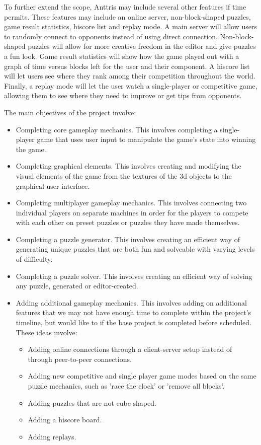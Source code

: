 \documentclass[12pt]{article}
\begin{document}
To further extend the scope, Anttris may include several other features if time permits. These features may include an online server, non-block-shaped puzzles, game result statistics, hiscore list and replay mode. A main server will allow users to randomly connect to opponents instead of using direct connection. Non-block-shaped puzzles will allow for more creative freedom in the editor and give puzzles a fun look. Game result statistics will show how the game played out with a graph of time versus blocks left for the user and their component. A hiscore list will let users see where they rank among their competition throughout the world. Finally, a replay mode will let the user watch a single-player or competitive game, allowing them to see where they need to improve or get tips from opponents.

The main objectives of the project involve:
\begin{itemize}
 \item Completing core gameplay mechanics. This involves completing a single-player game that uses user input to manipulate the game's state into winning the game.
 \item Completing graphical elements. This involves creating and modifying the visual elements of the game from the textures of the 3d objects to the graphical user interface.
 \item Completing multiplayer gameplay mechanics. This involves connecting two individual players on separate machines in order for the players to compete with each other on preset puzzles or puzzles they have made themselves.
 \item Completing a puzzle generator. This involves creating an efficient way of generating unique puzzles that are both fun and solveable with varying levels of difficulty.
 \item Completing a puzzle solver. This involves creating an efficient way of solving any puzzle, generated or editor-created.
 \item Adding additional gameplay mechanics. This involves adding on additional features that we may not have enough time to complete within the project's timeline, but would like to if the base project is completed before scheduled. These ideas involve:
  \begin{itemize}
  \item Adding online connections through a client-server setup instead of through peer-to-peer connections.
  \item Adding new competitive and single player game modes based on the same puzzle mechanics, such as 'race the clock' or 'remove all blocks'.
  \item Adding puzzles that are not cube shaped.
  \item Adding a hiscore board.
  \item Adding replays.
  \end{itemize}
\end{itemize}
\end{document}
